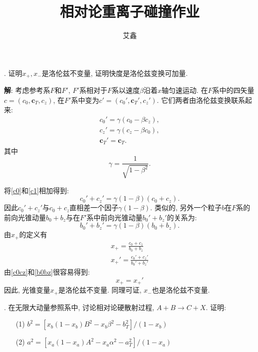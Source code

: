 \documentclass{ctexart}
\title{相对论重离子碰撞作业}
\author{艾鑫}
\newcounter{mycnt}
\newenvironment{problem}{\noindent \stepcounter{mycnt}\themycnt.}{

}
\newenvironment{answer}{\textbf{解}:}{
\vspace{0.5cm}
}
\begin{document}
\maketitle

\begin{problem}
  证明$x_+, x_-$是洛伦兹不变量, 证明快度是洛伦兹变换可加量.
\end{problem}

\begin{answer}
  考虑参考系$F$和$F'$, $F'$系相对于$F$系以速度$\beta$沿着$x$轴匀速运动. 在$F$系中的四矢量$c = (c_0, \bm{c}_T, c_z)$, 在$F'$系中变为$c' = (c_0', \bm{c}_T', c_z')$. 它们两者由洛伦兹变换联系起来:
  \begin{gather}\label{c0}
    c_0' = \gamma (c_0 - \beta c_z), \\ \label{c1}
    c_z' = \gamma (c_z - \beta c_0), \\
    \bm{c}_T' = \bm{c}_T.
  \end{gather}
其中
\begin{equation}
  \gamma = \frac{1}{\sqrt{1-\beta^2}}.
\end{equation}

将\eqref{c0}和\eqref{c1}相加得到:
\begin{equation}
  c_0' + c_z' = \gamma (1 - \beta) (c_0 + c_z). \label{c0cz}
\end{equation}
因此$c_0' + c_z'$与$c_0 + c_z$直相差一个因子$\gamma (1 - \beta)$. 类似的, 另外一个粒子$b$在$F$系的前向光锥动量$b_0 + b_z$与在$F'$系中前向光锥动量$b_0' + b_z'$的关系为:
\begin{equation}
  b_0' + b_z' = \gamma (1 - \beta) (b_0 + b_z). \label{b0bz}
\end{equation}
由$x_+$的定义有
\begin{gather}
  x_+ = \frac{c_0 + c_z}{b_0 + b_z} \\
  x_+' = \frac{c_0' + c_z'}{b_0' + b_z'}
\end{gather}
由\eqref{c0cz}和\eqref{b0bz}很容易得到:
\begin{equation}
  x_+ = x_+'
\end{equation}
因此, 光锥变量$x_+$是洛伦兹不变量. 同理可证, $x_-$也是洛伦兹不变量.


\end{answer}

\begin{problem}
  在无限大动量参照系中, 讨论相对论硬散射过程, $A + B \rightarrow C + X$. 证明:
  \begin{enumerate}
  \item[(1)] $b^2 = [x_b(1-x_b)B^2 - x_b \beta^2 - b_T^2]/(1 - x_b)$
  \item[(2)] $a^2 = [x_a(1-x_a)A^2 - x_a \alpha^2 - a_T^2]/(1 - x_a)$
  \end{enumerate}
\end{problem}
\end{document}
